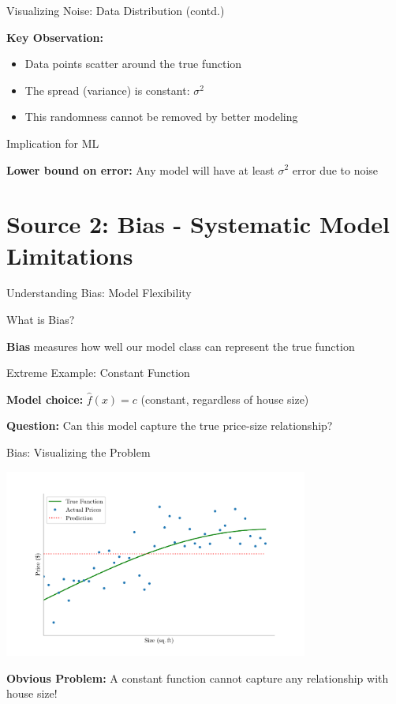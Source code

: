 \documentclass[10pt]{beamer}
\newcommand{\fitpic}[1]{\begin{adjustbox}{max width=\linewidth, max totalheight=0.78\textheight}#1\end{adjustbox}}
\begin{document}
\begin{frame}{Visualizing Noise: Data Distribution (contd.)}
\footnotesize
\begin{keypointsbox}
\raggedright
\textbf{Key Observation:} 
\begin{itemize}
\item Data points scatter around the true function
\item The spread (variance) is constant: $\sigma^2$
\item This randomness cannot be removed by better modeling
\end{itemize}
\end{keypointsbox}

\begin{alertbox}{Implication for ML}
\raggedright
\textbf{Lower bound on error:} Any model will have at least $\sigma^2$ error due to noise
\end{alertbox}
\end{frame}

\section{Source 2: Bias - Systematic Model Limitations}

\begin{frame}{Understanding Bias: Model Flexibility}
\small
\begin{definitionbox}{What is Bias?}
\raggedright
\textbf{Bias} measures how well our model class can represent the true function
\end{definitionbox}

\begin{examplebox}{Extreme Example: Constant Function}
\raggedright
\textbf{Model choice:} $\hat{f}(x) = c$ (constant, regardless of house size)

\textbf{Question:} Can this model capture the true price-size relationship?
\end{examplebox}
\end{frame}

\begin{frame}{Bias: Visualizing the Problem}
\begin{center}
\fitpic{\includegraphics[width=0.75\textwidth]{../assets/bias-variance/figures/biasn-2.pdf}}
\end{center}

\begin{alertbox}
\raggedright
\textbf{Obvious Problem:} A constant function cannot capture any relationship with house size!
\end{alertbox}
\end{frame}
\end{document}
